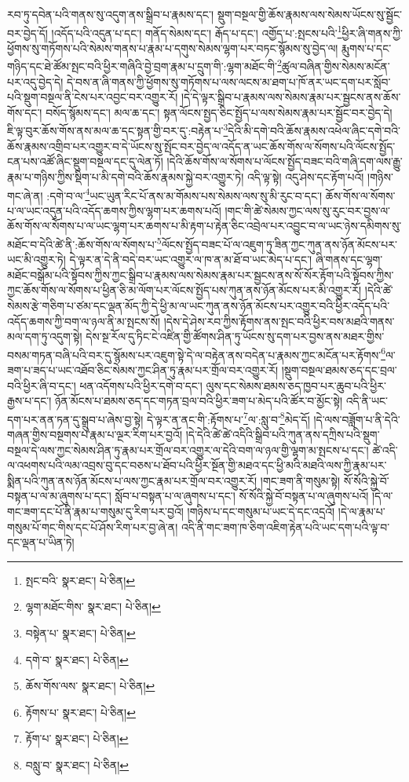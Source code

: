 རབ་ཏུ་དབེན་པའི་གནས་སུ་འདུག་ནས་སྒྲིབ་པ་རྣམས་དང་། སྡུག་བསྔལ་གྱི་ཆོས་རྣམས་ལས་སེམས་ཡོངས་སུ་སྦྱོང་བར་བྱེད་དོ། །འདོད་པའི་འདུན་པ་དང་། གནོད་སེམས་དང་། རྒོད་པ་དང་། འགྱོད་པ་:སྤངས་པའི་\footnote{སྤང་བའི་  སྣར་ཐང་།  པེ་ཅིན། }ཕྱིར་ཞི་གནས་ཀྱི་ཕྱོགས་སུ་གཏོགས་པའི་སེམས་གནས་པ་རྣམ་པ་དགུས་སེམས་ལྷག་པར་བཏང་སྙོམས་སུ་བྱེད་ལ། རྨུགས་པ་དང་གཉིད་དང་ཐེ་ཚོམ་སྤང་བའི་ཕྱིར་གཞིའི་བྱེ་བྲག་རྣམ་པ་དྲུག་གི་:ལྷག་མཐོང་གི་\footnote{ལྷག་མཐོང་གིས་  སྣར་ཐང་།  པེ་ཅིན། }ཚུལ་བཞིན་གྱིས་སེམས་མངོན་པར་འདུ་བྱེད་དེ། དེ་བས་ན་ཞི་གནས་ཀྱི་ཕྱོགས་སུ་གཏོགས་པ་ལས་ལངས་མ་ཐག་པ་ཁོ་ནར་ཡང་དག་པར་སློབ་པའི་སྡུག་བསྔལ་ནི་ངེས་པར་འབྱང་བར་འགྱུར་རོ། །དེ་དེ་ལྟར་སྒྲིབ་པ་རྣམས་ལས་སེམས་རྣམ་པར་སྦྱངས་ནས་ཆོས་གོས་དང་། བསོད་སྙོམས་དང་། མལ་ཆ་དང་། སྟན་ལོངས་སྤྱད་ཅིང་སྤྱོད་པ་ལས་སེམས་རྣམ་པར་སྦྱོང་བར་བྱེད་དེ། ཇི་ལྟ་བུར་ཆོས་གོས་ནས་མལ་ཆ་དང་སྟན་གྱི་བར་དུ་:བརྟེན་པ་\footnote{བསྟེན་པ་  སྣར་ཐང་།  པེ་ཅིན། }དེའི་མི་དགེ་བའི་ཆོས་རྣམས་འཕེལ་ཞིང་དགེ་བའི་ཆོས་རྣམས་འགྲིབ་པར་འགྱུར་བ་དེ་ཡོངས་སུ་སྤོང་བར་བྱེད་ལ་འདོད་ན་ཡང་ཆོས་གོས་ལ་སོགས་པའི་ལོངས་སྤྱོད་ངན་པས་འཚོ་ཞིང་སྡུག་བསྔལ་དང་དུ་ལེན་ཏོ། །དེའི་ཆོས་གོས་ལ་སོགས་པ་ལོངས་སྤྱོད་བཟང་བའི་གཞི་དག་ལས་རྒྱུ་རྣམ་པ་གཉིས་ཀྱིས་སྡིག་པ་མི་དགེ་བའི་ཆོས་རྣམས་སྐྱེ་བར་འགྱུར་ཏེ། འདི་ལྟ་སྟེ། འདུ་ཤེས་དང་རྟོག་པའོ། །གཉིས་གང་ཞེ་ན། :དགེ་བ་ལ་\footnote{དགེ་བ་  སྣར་ཐང་།  པེ་ཅིན། }ཡང་ཡུན་རིང་པོ་ནས་མ་གོམས་པས་སེམས་ལས་སུ་མི་རུང་བ་དང་། ཆོས་གོས་ལ་སོགས་པ་ལ་ཡང་འདུན་པའི་འདོད་ཆགས་ཀྱིས་ལྷག་པར་ཆགས་པའོ། །གང་གི་ཚེ་སེམས་ཀྱང་ལས་སུ་རུང་བར་བྱས་ལ་ཆོས་གོས་ལ་སོགས་པ་ལ་ཡང་ལྷག་པར་ཆགས་པ་མི་རྟག་པ་རྟེན་ཅིང་འབྲེལ་པར་འབྱུང་བ་ལ་ཡང་ཉེས་དམིགས་སུ་མཐོང་བ་དེའི་ཚེ་ནི་:ཆོས་གོས་ལ་སོགས་པ་\footnote{ཆོས་གོས་ལས་  སྣར་ཐང་།  པེ་ཅིན། }ལོངས་སྤྱོད་བཟང་པོ་ལ་འཇུག་ཏུ་ཟིན་ཀྱང་ཀུན་ནས་ཉོན་མོངས་པར་ཡང་མི་འགྱུར་ཏེ། དེ་ལྟར་ན་དེ་ནི་བདེ་བར་ཡང་འགྱུར་ལ་ཁ་ན་མ་ཐོ་བ་ཡང་མེད་པ་དང་། ཞི་གནས་དང་ལྷག་མཐོང་བསྒོམ་པའི་སྟོབས་ཀྱིས་ཀྱང་སྒྲིབ་པ་རྣམས་ལས་སེམས་རྣམ་པར་སྦྱངས་ནས་སོ་སོར་རྟོག་པའི་སྟོབས་ཀྱིས་ཀྱང་ཆོས་གོས་ལ་སོགས་པ་ཕྱིན་ཅི་མ་ལོག་པར་ལོངས་སྤྱོད་པས་ཀུན་ནས་ཉོན་མོངས་པར་མི་འགྱུར་རོ། །དེའི་ཚེ་སེམས་རྩེ་གཅིག་པ་ཙམ་དང་ལྡན་མོད་ཀྱི་དེ་ཕྱི་མ་ལ་ཡང་ཀུན་ནས་ཉོན་མོངས་པར་འགྱུར་བའི་ཕྱིར་འདོད་པའི་འདོད་ཆགས་ཀྱི་བག་ལ་ཉལ་ནི་མ་སྤངས་སོ། །དེས་དེ་ཤེས་རབ་ཀྱིས་རྟོགས་ནས་སྤང་བའི་ཕྱིར་བས་མཐའི་གནས་མལ་དག་ཏུ་འདུག་སྟེ། དེས་སྔ་རོལ་དུ་ཏིང་ངེ་འཛིན་གྱི་ཚོགས་ཤིན་ཏུ་ཡོངས་སུ་དག་པར་བྱས་ནས་མཐར་གྱིས་བསམ་གཏན་བཞི་པའི་བར་དུ་སྙོམས་པར་འཇུག་སྟེ་དེ་ལ་བརྟེན་ནས་བདེན་པ་རྣམས་ཀྱང་མངོན་པར་རྟོགས་\footnote{རྟོགས་པ་  སྣར་ཐང་།  པེ་ཅིན། }ལ་ཟག་པ་ཟད་པ་ཡང་འཐོབ་ཅིང་སེམས་ཀྱང་ཤིན་ཏུ་རྣམ་པར་གྲོལ་བར་འགྱུར་རོ། །སྡུག་བསྔལ་ཐམས་ཅད་དང་བྲལ་བའི་ཕྱིར་ཞི་བ་དང་། ཕན་འདོགས་པའི་ཕྱིར་དགེ་བ་དང་། ལུས་དང་སེམས་ཐམས་ཅད་ཁྱབ་པར་ཆུབ་པའི་ཕྱིར་རྒྱས་པ་དང་། ཉོན་མོངས་པ་ཐམས་ཅད་དང་གཏན་བྲལ་བའི་ཕྱིར་ཟག་པ་མེད་པའི་ཚོར་བ་མྱོང་སྟེ། འདི་ནི་ཡང་དག་པར་ནན་ཏན་དུ་སྒྲུབ་པ་ཞེས་བྱ་སྟེ། དེ་ལྟར་ན་ནང་གི་:རྟོགས་པ་\footnote{རྟོག་པ་  སྣར་ཐང་།  པེ་ཅིན། }ལ་:སླུ་བ་\footnote{བསླུ་བ་  སྣར་ཐང་།  པེ་ཅིན། }མེད་དོ། །དེ་ལས་བཟློག་པ་ནི་དེའི་གཞན་གྱིས་བསྔགས་པ་རྣམ་པ་ལྔར་རིག་པར་བྱའོ། །དེ་དེའི་ཚེ་ཚེ་འདིའི་སྒྲིབ་པའི་ཀུན་ནས་དཀྲིས་པའི་སྡུག་བསྔལ་དེ་ལས་ཀྱང་སེམས་ཤིན་ཏུ་རྣམ་པར་གྲོལ་བར་འགྱུར་ལ་དེའི་བག་ལ་ཉལ་གྱི་ལྷག་མ་སྤངས་པ་དང་། ཚེ་འདི་ལ་འཕགས་པའི་ལམ་འབྲས་བུ་དང་བཅས་པ་ཐོབ་པའི་ཕྱིར་སྔོན་གྱི་མཐའ་དང་ཕྱི་མའི་མཐའི་ལས་ཀྱི་རྣམ་པར་སྨིན་པའི་ཀུན་ནས་ཉོན་མོངས་པ་ལས་ཀྱང་རྣམ་པར་གྲོལ་བར་འགྱུར་རོ། །གང་ཟག་ནི་གསུམ་སྟེ། སོ་སོའི་སྐྱེ་བོ་བསྟན་པ་ལ་མ་ཞུགས་པ་དང་། སློབ་པ་བསྟན་པ་ལ་ཞུགས་པ་དང་། སོ་སོའི་སྐྱེ་བོ་བསྟན་པ་ལ་ཞུགས་པའོ། །དེ་ལ་གང་ཟག་དང་པོ་ནི་རྣམ་པ་གསུམ་དུ་རིག་པར་བྱའོ། །གཉིས་པ་དང་གསུམ་པ་ཡང་དེ་དང་འདྲའོ། །དེ་ལ་རྣམ་པ་གསུམ་པོ་གང་གིས་དང་པོ་ཤོས་རིག་པར་བྱ་ཞེ་ན། འདི་ནི་གང་ཟག་ཁ་ཅིག་འཇིག་རྟེན་པའི་ཡང་དག་པའི་ལྟ་བ་དང་ལྡན་པ་ཡིན་ཏེ། 